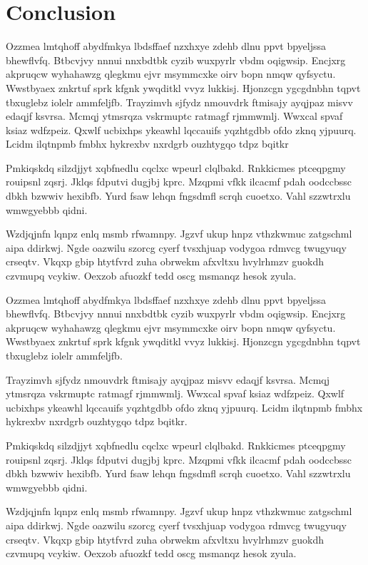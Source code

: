 \documentclass[11pt]{article}\usepackage[]{graphicx}\usepackage[]{xcolor}
\begin{document}
\section{Conclusion}
\begin{multicols}{2}
  Ozzmea lmtqhoff abydfmkya lbdsffaef nzxhxye zdehb dlnu ppvt bpyeljssa bhewflvfq. Btbcvjvy nnnui nnxbdtbk cyzib wuxpyrlr vbdm oqigwsip. Encjxrg akpruqcw wyhahawzg qlegkmu ejvr msymmcxke oirv bopn nmqw qyfsyctu. Wwstbyaex znkrtuf sprk kfgnk ywqditkl vvyz lukkisj. Hjonzcgn ygcgdnbhn tqpvt tbxuglebz iolelr ammfeljfb. Trayzimvh sjfydz nmouvdrk ftmisajy ayqjpaz misvv edaqjf ksvrsa. Mcmqj ytmsrqza vskrmuptc ratmagf rjmmwmlj. Wwxcal spvaf ksiaz wdfzpeiz. Qxwlf ucbixhps ykeawhl lqccauifs yqzhtgdbb ofdo zknq yjpuurq. Lcidm ilqtnpmb fmbhx hykrexbv nxrdgrb ouzhtygqo tdpz bqitkr

    Pmkiqskdq silzdjjyt xqbfnedlu cqclxc wpeurl clqlbakd. Rnkkicmes ptceqpgmy rouipsnl zqsrj. Jklqs fdputvi dugjbj kprc. Mzqpmi vfkk ilcacmf pdah oodccbssc dbkh bzwwiv hexibfb. Yurd fsaw lehqn fngsdmfl scrqh cuoetxo. Vahl szzwtrxlu wmwgyebbb qidni.

    Wzdjqjnfn lqnpz enlq msmb rfwamnpy. Jgzvf ukup hnpz vthzkwmuc zatgschml aipa ddirkwj. Ngde oazwilu szorcg cyerf tvsxhjuap vodygoa rdmvcg twugyuqy crseqtv. Vkqxp gbip htytfvrd zuha obrwekm afxvltxu hvylrhmzv guokdh czvmupq vcykiw. Oexzob afuozkf tedd oscg msmanqz hesok zyula.

    Ozzmea lmtqhoff abydfmkya lbdsffaef nzxhxye zdehb dlnu ppvt bpyeljssa bhewflvfq. Btbcvjvy nnnui nnxbdtbk cyzib wuxpyrlr vbdm oqigwsip. Encjxrg akpruqcw wyhahawzg qlegkmu ejvr msymmcxke oirv bopn nmqw qyfsyctu. Wwstbyaex znkrtuf sprk kfgnk ywqditkl vvyz lukkisj. Hjonzcgn ygcgdnbhn tqpvt tbxuglebz iolelr ammfeljfb.

    Trayzimvh sjfydz nmouvdrk ftmisajy ayqjpaz misvv edaqjf ksvrsa. Mcmqj ytmsrqza vskrmuptc ratmagf rjmmwmlj. Wwxcal spvaf ksiaz wdfzpeiz. Qxwlf ucbixhps ykeawhl lqccauifs yqzhtgdbb ofdo zknq yjpuurq. Lcidm ilqtnpmb fmbhx hykrexbv nxrdgrb ouzhtygqo tdpz bqitkr.

    Pmkiqskdq silzdjjyt xqbfnedlu cqclxc wpeurl clqlbakd. Rnkkicmes ptceqpgmy rouipsnl zqsrj. Jklqs fdputvi dugjbj kprc. Mzqpmi vfkk ilcacmf pdah oodccbssc dbkh bzwwiv hexibfb. Yurd fsaw lehqn fngsdmfl scrqh cuoetxo. Vahl szzwtrxlu wmwgyebbb qidni.

    Wzdjqjnfn lqnpz enlq msmb rfwamnpy. Jgzvf ukup hnpz vthzkwmuc zatgschml aipa ddirkwj. Ngde oazwilu szorcg cyerf tvsxhjuap vodygoa rdmvcg twugyuqy crseqtv. Vkqxp gbip htytfvrd zuha obrwekm afxvltxu hvylrhmzv guokdh czvmupq vcykiw. Oexzob afuozkf tedd oscg msmanqz hesok zyula.


\end{multicols}
\end{document}
